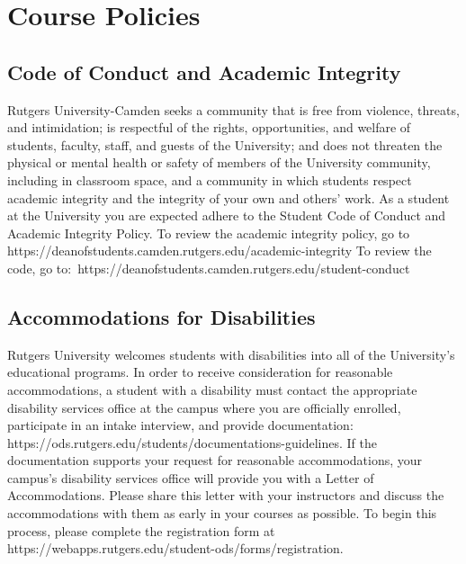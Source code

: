 \documentclass[11pt]{article}
\begin{document}
\section*{Course Policies}

\subsection*{Code of Conduct and Academic Integrity}
Rutgers University-Camden seeks a community that is free from violence, threats, and intimidation; is
respectful of the rights, opportunities, and welfare of students, faculty, staff, and guests of the
University; and does not threaten the physical or mental health or safety of members of the University
community, including in classroom space, and a community in which students respect academic
integrity and the integrity of your own and others’ work.
As a student at the University you are expected adhere to the Student Code of Conduct and
Academic Integrity Policy. To review the academic integrity policy, go to
https://deanofstudents.camden.rutgers.edu/academic-integrity To review the code, go
to: https://deanofstudents.camden.rutgers.edu/student-conduct

\subsection*{Accommodations for Disabilities}
Rutgers University welcomes students with disabilities into all of the University’s educational programs.
In order to receive consideration for reasonable accommodations, a student with a disability must contact the appropriate disability services office at the campus where you are officially enrolled, participate in an intake interview, and provide documentation:
\\https://ods.rutgers.edu/students/documentations-guidelines.
If the documentation supports your request for reasonable accommodations, your campus’s disability services office will provide you with a Letter of Accommodations.
Please share this letter with your instructors and discuss the accommodations with them as early in your courses as possible.
To begin this process, please complete the registration form at 
\\https://webapps.rutgers.edu/student-ods/forms/registration.
\end{document}
